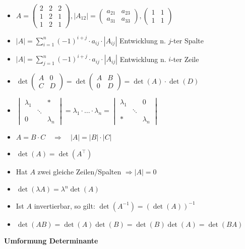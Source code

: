 \documentclass[8pt,a4paper]{scrartcl}
\newcommand{\C}{\ensuremath{\mathbb C}}
\begin{document}
\begin{multicols*}{3}
				\begin{itemize}\itemsep0pt
				\item $A=\begin{pmatrix}2&2&2\\1&2&1\\1&2&1\end{pmatrix},|A_{12}| = \begin{pmatrix}a_{21}&a_{23}\\a_{31}&a_{33}\end{pmatrix},\begin{pmatrix}1&1\\1&1\end{pmatrix} $ 
					\item $|A|=\sum\limits_{i=1}^n (-1)^{i+j} \cdot a_{ij} \cdot |A_{ij}|$ \qquad Entwicklung n. $j$-ter Spalte
					\item $|A|=\sum\limits_{j=1}^n (-1)^{i+j} \cdot a_{ij} \cdot |A_{ij}|$ \qquad Entwicklung n. $i$-ter Zeile
					\item $\det\begin{pmatrix}A&0\\C&D\end{pmatrix}=\det\begin{pmatrix}A&B\\0&D\end{pmatrix}=\det(A)\cdot\det(D)$
					\item $\begin{vmatrix}\lambda_1&&* \\ &\ddots& \\ 0&&\lambda_n \end{vmatrix} = \lambda_1\cdot \ldots\cdot \lambda_n = \begin{vmatrix} \lambda_1&&0  \\  &\ddots& \\  *&&\lambda_n \end{vmatrix}$
					\item $A=B \cdot C \quad \Rightarrow \quad |A|=|B| \cdot |C|$
					\item $\det(A)=\det(A^\top)$
					\item Hat $A$ zwei gleiche Zeilen/Spalten $\Rightarrow |A|=0$
					\item $\det(\lambda A)=\lambda^n \det(A)$
					\item Ist $A$ invertierbar, so gilt: $\det(A^{-1})=(\det(A))^{-1}$
					\item $\det(AB) = \det(A) \det(B) = \det(B) \det(A) = \det(BA)$
				\end{itemize}
				\textbf{Umformung Determinante}

\end{multicols*}
\end{document}
